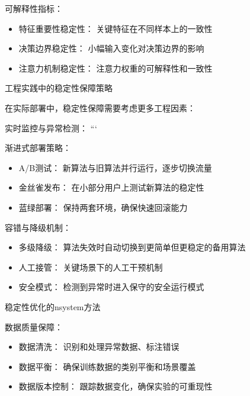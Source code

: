 可解释性指标：
\begin{itemize}
\item 特征重要性稳定性： 关键特征在不同样本上的一致性
\item 决策边界稳定性： 小幅输入变化对决策边界的影响
\item 注意力机制稳定性： 注意力权重的可解释性和一致性
\end{itemize}

工程实践中的稳定性保障策略

在实际部署中，稳定性保障需要考虑更多工程因素：

实时监控与异常检测：
%    
%        
%        
%        
```

渐进式部署策略：
\begin{itemize}
\item A/B测试： 新算法与旧算法并行运行，逐步切换流量
\item 金丝雀发布： 在小部分用户上测试新算法的稳定性
\item 蓝绿部署： 保持两套环境，确保快速回滚能力
\end{itemize}

容错与降级机制：
\begin{itemize}
\item 多级降级： 算法失效时自动切换到更简单但更稳定的备用算法
\item 人工接管： 关键场景下的人工干预机制
\item 安全模式： 检测到异常时进入保守的安全运行模式
\end{itemize}

稳定性优化的nsystem方法

数据质量保障：
\begin{itemize}
\item 数据清洗： 识别和处理异常数据、标注错误
\item 数据平衡： 确保训练数据的类别平衡和场景覆盖
\item 数据版本控制： 跟踪数据变化，确保实验的可重现性
\end{itemize}

